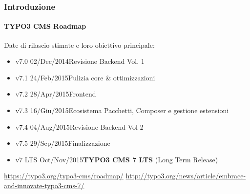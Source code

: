 \begin{frame}[fragile]
	\frametitle{Introduzione}
	\framesubtitle{TYPO3 CMS Roadmap}

	Date di rilascio stimate e loro obiettivo principale:

	\begin{itemize}
		\item v7.0 \tabto{1.1cm}02/Dec/2014\tabto{3.4cm}Revisione Backend Vol. 1
		\item v7.1 \tabto{1.1cm}24/Feb/2015\tabto{3.4cm}Pulizia core \& ottimizzazioni
		\item v7.2 \tabto{1.1cm}28/Apr/2015\tabto{3.4cm}Frontend
		\item v7.3 \tabto{1.1cm}16/Giu/2015\tabto{3.4cm}Ecosistema Pacchetti, Composer\newline
			\tabto{3.4cm}e gestione estensioni
		\item v7.4 \tabto{1.1cm}04/Aug/2015\tabto{3.4cm}Revisione Backend Vol 2

		\item
			\begingroup
				\color{typo3orange}
					v7.5 \tabto{1.1cm}29/Sep/2015\tabto{3.4cm}Finalizzazione
			\endgroup

		\item v7 LTS \tabto{1.1cm}Oct/Nov/2015\tabto{3.4cm}\textbf{TYPO3 CMS 7 LTS} (Long Term Release)
	\end{itemize}

	\smaller
		\url{https://typo3.org/typo3-cms/roadmap/}\newline
		\url{http://typo3.org/news/article/embrace-and-innovate-typo3-cms-7/}
	\normalsize

\end{frame}


